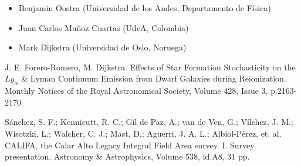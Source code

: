 \documentclass[12pt]{article}
\begin{document}

\begin{itemize}
	\item Benjamin Oostra (Universidad de los Andes, Departamento
          de F\'isica) 
	\item Juan Carlos Mu\~noz Cuartas (UdeA, Colombia)
	\item Mark Dijkstra (Universidad de Oslo, Noruega)
\end{itemize}


\begin{thebibliography}{10}

 J. E. Forero-Romero, M. Dijkstra. Effects of Star Formation Stochasticity on the $Ly_{\alpha}$ \&
Lyman Continuum Emission from Dwarf Galaxies during
Reionization. Monthly Notices of the Royal Astronomical Society, Volume 428, Issue 3, p.2163-2170

 S\'anchez, S. F.; Kennicutt, R. C.; Gil de Paz,
A.; van de Ven, G.; V\'ilchez, J. M.; Wisotzki, L.; Walcher, C. J.;
Mast, D.; Aguerri, J. A. L.; Albiol-P\'erez, et. al. CALIFA, the
  Calar Alto Legacy Integral Field Area survey. I. Survey
  presentation. Astronomy \& Astrophysics, Volume 538, id.A8, 31 pp.



\end{thebibliography}
\end{document}
